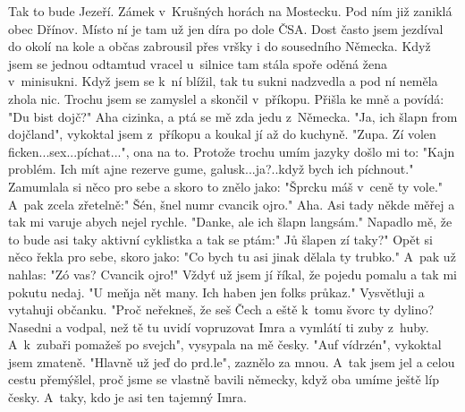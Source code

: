 
Tak to bude Jezeří. Zámek v~Krušných horách na Mostecku. Pod ním již
zaniklá obec Dřínov. Místo ní je tam už jen díra po dole ČSA. Dost
často jsem jezdíval do okolí na kole a občas zabrousil přes vršky i do
sousedního Německa. Když jsem se jednou odtamtud vracel u~silnice tam
stála spoře oděná žena v~minisukni. Když jsem se k~ní blížil, tak tu
sukni nadzvedla a pod ní neměla zhola nic. Trochu jsem se zamyslel a
skončil v~příkopu. Přišla ke mně a povídá: "Du bist dojč?" Aha
cizinka, a ptá se mě zda jedu z~Německa. "Ja, ich šlapn from
dojčland", vykoktal jsem z~příkopu a koukal jí až do kuchyně. "Zupa.
Zí volen ficken...sex...píchat...", ona na to. Protože trochu umím
jazyky došlo mi to: "Kajn problém. Ich mít ajne rezerve gume,
galusk...ja?..když bych ich píchnout." Zamumlala si něco pro sebe a
skoro to znělo jako: "Šprcku máš v~ceně ty vole." A~pak zcela
zřetelně:" Šén, šnel numr cvancik ojro." Aha. Asi tady někde měřej a
tak mi varuje abych nejel rychle. "Danke, ale ich šlapn langsám."
Napadlo mě, že to bude asi taky aktivní cyklistka a tak se ptám:" Jů
šlapen zí taky?" Opět si něco řekla pro sebe, skoro jako: "Co bych tu
asi jinak dělala ty trubko." A~pak už nahlas: "Zó vas? Cvancik ojro!"
Vždyť už jsem jí říkal, že pojedu pomalu a tak mi pokutu nedaj. "U
meňja nět many. Ich haben jen folks průkaz." Vysvětluji a vytahuji
občanku. "Proč neřekneš, že seš Čech a eště k~tomu švorc ty dylino?
Nasedni a vodpal, než tě tu uvidí vopruzovat Imra a vymlátí ti zuby
z~huby. A~k~zubaři pomažeš po svejch", vysypala na mě česky. "Auf
vídrzén", vykoktal jsem zmateně. "Hlavně už jeď do prd.le", zaznělo
za mnou. A~tak jsem jel a celou cestu přemýšlel, proč jsme se vlastně
bavili německy, když oba umíme ještě líp česky. A~taky, kdo je asi ten
tajemný Imra.

